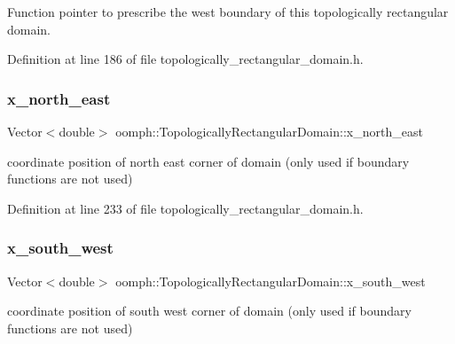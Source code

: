 Function pointer to prescribe the west boundary of this topologically rectangular domain. 



Definition at line 186 of file topologically\+\_\+rectangular\+\_\+domain.\+h.

\mbox{\label{classoomph_1_1TopologicallyRectangularDomain_aea8383a0d263080b49c3cbaee4af7833}} 
\subsubsection{\texorpdfstring{x\+\_\+north\+\_\+east}{x\_north\_east}}
{\footnotesize\ttfamily Vector$<$double$>$ oomph\+::\+Topologically\+Rectangular\+Domain\+::x\+\_\+north\+\_\+east\hspace{0.3cm}{\ttfamily [private]}}



coordinate position of north east corner of domain (only used if boundary functions are not used) 



Definition at line 233 of file topologically\+\_\+rectangular\+\_\+domain.\+h.

\mbox{\label{classoomph_1_1TopologicallyRectangularDomain_a2e58acf65777d33e580b4953b7753b45}} 
\subsubsection{\texorpdfstring{x\+\_\+south\+\_\+west}{x\_south\_west}}
{\footnotesize\ttfamily Vector$<$double$>$ oomph\+::\+Topologically\+Rectangular\+Domain\+::x\+\_\+south\+\_\+west\hspace{0.3cm}{\ttfamily [private]}}



coordinate position of south west corner of domain (only used if boundary functions are not used) 



